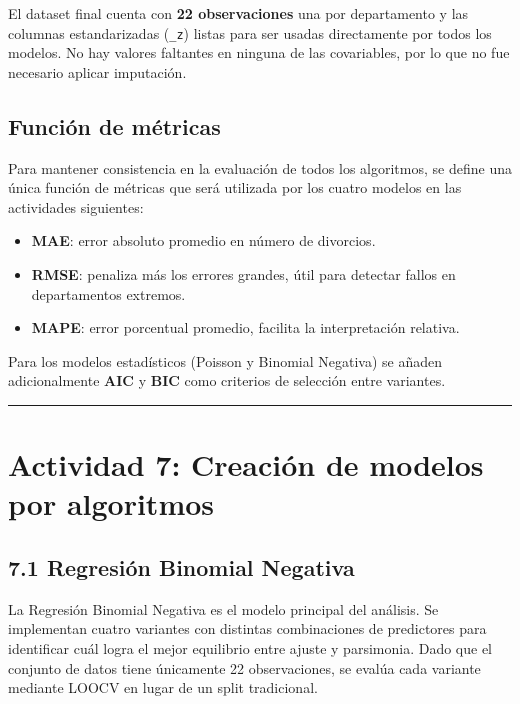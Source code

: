 \documentclass[
]{article}
\providecommand{\tightlist}{%
  \setlength{\itemsep}{0pt}\setlength{\parskip}{0pt}}
\begin{document}
El dataset final cuenta con \textbf{22 observaciones} una por
departamento y las columnas estandarizadas (\texttt{\_z}) listas para
ser usadas directamente por todos los modelos. No hay valores faltantes
en ninguna de las covariables, por lo que no fue necesario aplicar
imputación.

\hypertarget{funciuxf3n-de-muxe9tricas}{%
\subsection{Función de métricas}\label{funciuxf3n-de-muxe9tricas}}

Para mantener consistencia en la evaluación de todos los algoritmos, se
define una única función de métricas que será utilizada por los cuatro
modelos en las actividades siguientes:

\begin{itemize}
\tightlist
\item
  \textbf{MAE}: error absoluto promedio en número de divorcios.
\item
  \textbf{RMSE}: penaliza más los errores grandes, útil para detectar
  fallos en departamentos extremos.
\item
  \textbf{MAPE}: error porcentual promedio, facilita la interpretación
  relativa.
\end{itemize}

Para los modelos estadísticos (Poisson y Binomial Negativa) se añaden
adicionalmente \textbf{AIC} y \textbf{BIC} como criterios de selección
entre variantes.

\begin{center}\rule{0.5\linewidth}{0.5pt}\end{center}

\hypertarget{actividad-7-creaciuxf3n-de-modelos-por-algoritmos}{%
\section{Actividad 7: Creación de modelos por
algoritmos}\label{actividad-7-creaciuxf3n-de-modelos-por-algoritmos}}

\hypertarget{regresiuxf3n-binomial-negativa}{%
\subsection{7.1 Regresión Binomial
Negativa}\label{regresiuxf3n-binomial-negativa}}

La Regresión Binomial Negativa es el modelo principal del análisis. Se
implementan cuatro variantes con distintas combinaciones de predictores
para identificar cuál logra el mejor equilibrio entre ajuste y
parsimonia. Dado que el conjunto de datos tiene únicamente 22
observaciones, se evalúa cada variante mediante LOOCV en lugar de un
split tradicional.
\end{document}
